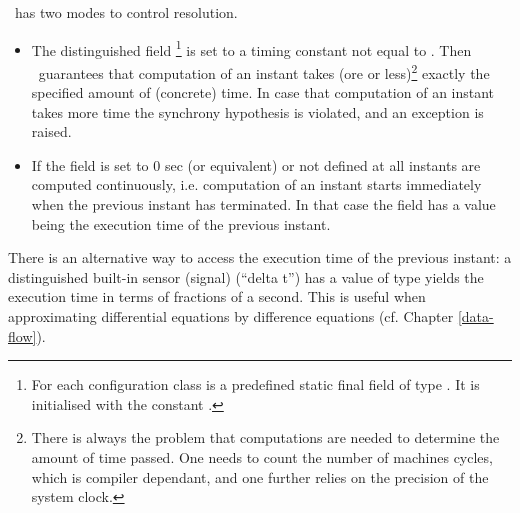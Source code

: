{\se\ has two modes to control resolution.
\begin{itemize}
\item The distinguished field \footnote{For each configuration class  is a predefined static final field of type . It is initialised with the constant .} is set to a timing constant not equal to . Then \se\ guarantees that computation of an instant takes (ore or less)\footnote{There is always the problem that computations are needed to determine the amount of time passed. One needs to count the number of machines cycles, which is compiler dependant, and one further relies on the precision of the system clock.} exactly the specified amount of (concrete) time. In case that computation of an instant takes more time the synchrony hypothesis is violated, and an exception is raised.

\item If the field  is set to 0 sec (or equivalent) or not defined at all instants are computed continuously, i.e. computation of an instant starts immediately when the previous instant has terminated. In that case the 
field  has a value being the execution time of the previous instant.
\end{itemize}
There is an alternative way to access the execution time of the previous instant: a distinguished built-in sensor (signal)  (``delta t'') has a value of type  yields the execution time in terms of fractions of a second. This is useful when approximating differential equations by difference equations (cf. Chapter \ref{data-flow}).
}





